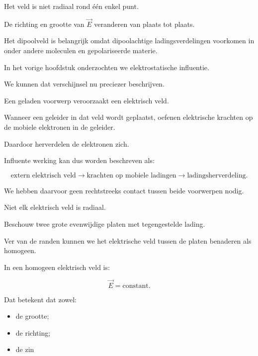\documentclass{ximera}
\begin{document}
Het veld is niet radiaal rond één enkel punt.

De richting en grootte van $\vec E$ veranderen van plaats tot plaats.

Het dipoolveld is belangrijk omdat dipoolachtige ladingsverdelingen
voorkomen in onder andere moleculen en gepolariseerde materie.




In het vorige hoofdstuk onderzochten we elektrostatische influentie.

We kunnen dat verschijnsel nu preciezer beschrijven.

Een geladen voorwerp veroorzaakt een elektrisch veld.

Wanneer een geleider in dat veld wordt geplaatst, oefenen elektrische
krachten op de mobiele elektronen in de geleider.

Daardoor herverdelen de elektronen zich.

Influente werking kan dus worden beschreven als:

\[
\boxed{
\text{extern elektrisch veld}
\longrightarrow
\text{krachten op mobiele ladingen}
\longrightarrow
\text{ladingsherverdeling}.
}
\]

We hebben daarvoor geen rechtstreeks contact tussen beide voorwerpen
nodig.




Niet elk elektrisch veld is radiaal.

Beschouw twee grote evenwijdige platen met tegengestelde lading.

Ver van de randen kunnen we het elektrische veld tussen de platen
benaderen als homogeen.

In een homogeen elektrisch veld is:

\[
\boxed{
\vec E=\text{constant}.
}
\]

Dat betekent dat zowel:

\begin{itemize}
  \item de grootte;
  \item de richting;
  \item de zin
\end{itemize}
\end{document}

